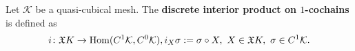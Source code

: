\begin{definition}
  Let $\mathcal{K}$ be a quasi-cubical mesh.
  The \textbf{discrete interior product on $1$-cochains} is defined as
  \begin{equation}
    i \colon \mathfrak{X} K \to \mathop{\rm Hom}\nolimits(C^1 \mathcal{K}, C^0 \mathcal{K}),
    i_X \sigma := \sigma \circ X,\
    X \in \mathfrak{X} K,\ \sigma \in C^1 \mathcal{K}.
  \end{equation}
\end{definition}
